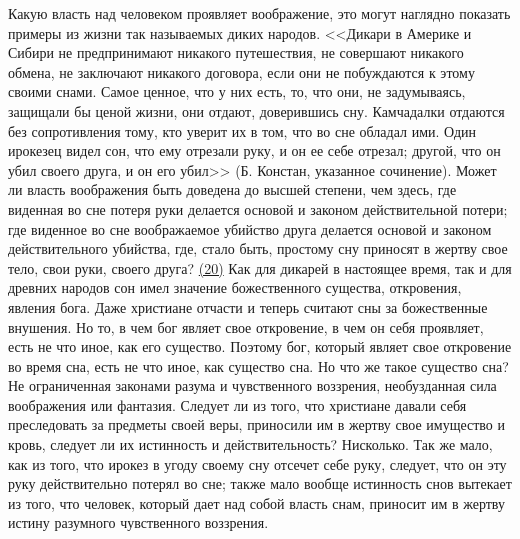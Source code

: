 \documentclass[12pt]{article}
\begin{document}
Какую власть над человеком проявляет воображение, это могут наглядно показать примеры из жизни так называемых диких народов. <<Дикари в Америке и Сибири не предпринимают никакого путешествия, не совершают никакого обмена, не заключают никакого договора, если они не побуждаются к этому своими снами. Самое ценное, что у них есть, то, что они, не задумываясь, защищали бы ценой жизни, они отдают, доверившись сну. Камчадалки отдаются без сопротивления тому, кто уверит их в том, что во сне обладал ими. Один ирокезец видел сон, что ему отрезали руку, и он ее себе отрезал; другой, что он убил своего друга, и он его убил>> (Б. Констан, указанное сочинение). Может ли власть воображения быть доведена до высшей степени, чем здесь, где виденная во сне потеря руки делается основой и законом действительной потери; где виденное во сне воображаемое убийство друга делается основой и законом действительного убийства, где, стало быть, простому сну приносят в жертву свое тело, свои руки, своего друга? \hyperlink{20}{(20)}\hypertarget{b20}{} Как для дикарей в настоящее время, так и для древних народов сон имел значение божественного существа, откровения, явления бога. Даже христиане отчасти и теперь считают сны за божественные внушения. Но то, в чем бог являет свое откровение, в чем он себя проявляет, есть не что иное, как его существо. Поэтому бог, который являет свое откровение во время сна, есть не что иное, как существо сна. Но что же такое существо сна? Не ограниченная законами разума и чувственного воззрения, необузданная сила воображения или фантазия. Следует ли из того, что христиане давали себя преследовать за предметы своей веры, приносили им в жертву свое имущество и кровь, следует ли их истинность и действительность? Нисколько. Так же мало, как из того, что ирокез в угоду своему сну отсечет себе руку, следует, что он эту руку действительно потерял во сне; также мало вообще истинность снов вытекает из того, что человек, который дает над собой власть снам, приносит им в жертву истину разумного чувственного воззрения. 
\end{document}

